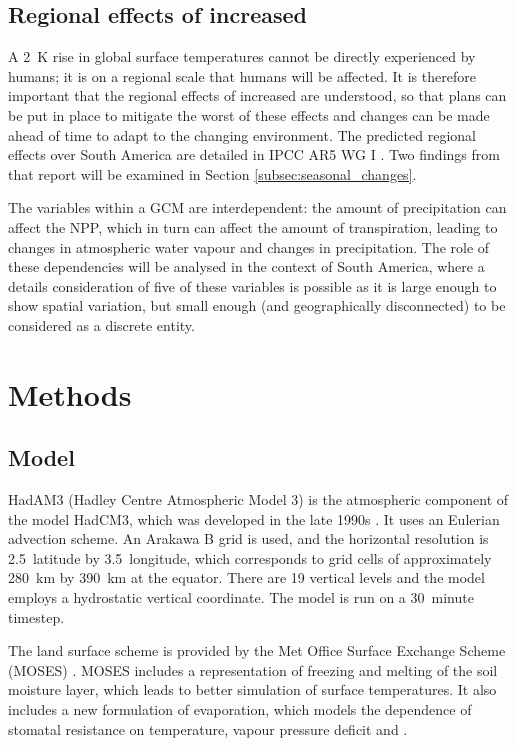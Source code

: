 \documentclass{article}
\begin{document}
\subsection{Regional effects of increased }
\label{sec:regional_effects}
A \SI{2}{K} rise in global surface temperatures cannot be directly experienced by humans; it is on a regional scale that humans will be affected. It is therefore important that the regional effects of increased  are understood, so that plans can be put in place to mitigate the worst of these effects and changes can be made ahead of time to adapt to the changing environment. The predicted regional effects over South America are detailed in IPCC AR5 WG I \parencite{ipcc2014wg1}. Two findings from that report will be examined in Section \ref{subsec:seasonal_changes}.

The variables within a GCM are interdependent: the amount of precipitation can affect the NPP, which in turn can affect the amount of transpiration, leading to changes in atmospheric water vapour and changes in precipitation. The role of these dependencies will be analysed in the context of South America, where a details consideration of five of these variables is possible as it is large enough to show spatial variation, but small enough (and geographically disconnected) to be considered as a discrete entity.

\section{Methods}

\subsection{Model}

HadAM3 (Hadley Centre Atmospheric Model 3) is the atmospheric component of the model HadCM3, which was developed in the late 1990s \parencite{pope2000impact}. It uses an Eulerian advection scheme. An Arakawa B grid is used, and the horizontal resolution is 2.5\textdegree\,  latitude by 3.5\textdegree\, longitude, which corresponds to grid cells of approximately \SI{280}{km} by \SI{390}{km} at the equator. There are 19 vertical levels and the model employs a hydrostatic vertical coordinate. The model is run on a \SI{30}{minute} timestep.

The land surface scheme is provided by the Met Office Surface Exchange Scheme (MOSES) \parencite{cox1999impact}. MOSES includes a representation of freezing and melting of the soil moisture layer, which leads to better simulation of surface temperatures. It also includes a new formulation of evaporation, which models the dependence of stomatal resistance on temperature, vapour pressure deficit and .
\end{document}
